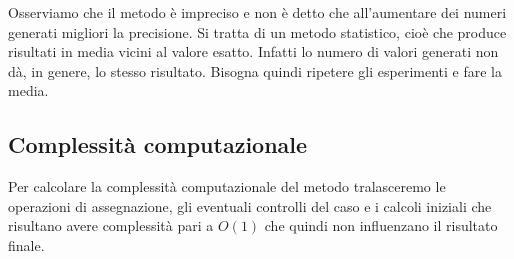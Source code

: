\documentclass{article}
\begin{document}
\hfill

Osserviamo che il metodo è impreciso e non è detto che all'aumentare dei numeri generati migliori la precisione. Si tratta di un metodo statistico, cioè che produce risultati in media vicini al valore esatto. Infatti lo numero di valori generati non dà, in genere, lo stesso risultato. Bisogna quindi ripetere gli esperimenti e fare la media.

\subsection{Complessità computazionale}

Per calcolare la complessità computazionale del metodo tralasceremo le operazioni di assegnazione, gli eventuali controlli del caso e i calcoli iniziali che risultano avere complessità pari a $O(1)$ che quindi non influenzano il risultato finale.
\end{document}
